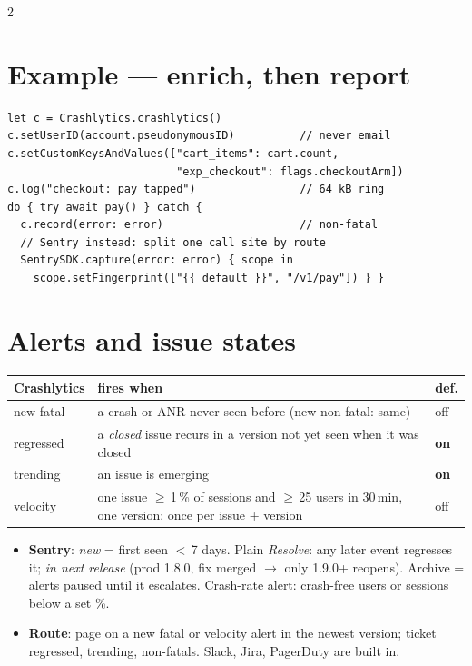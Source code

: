 \documentclass[8pt]{extarticle}
\begin{document}
\begin{multicols}{2}
\section{Example — enrich, then report}
\begin{lstlisting}[language=SwiftSheet]
let c = Crashlytics.crashlytics()
c.setUserID(account.pseudonymousID)          // never email
c.setCustomKeysAndValues(["cart_items": cart.count,
                          "exp_checkout": flags.checkoutArm])
c.log("checkout: pay tapped")                // 64 kB ring
do { try await pay() } catch {
  c.record(error: error)                     // non-fatal
  // Sentry instead: split one call site by route
  SentrySDK.capture(error: error) { scope in
    scope.setFingerprint(["{{ default }}", "/v1/pay"]) } }
\end{lstlisting}

\columnbreak

\section{Alerts and issue states}
{\footnotesize\setlength{\tabcolsep}{3pt}
\begin{tabular}{@{}>{\raggedright\arraybackslash}p{16mm}>{\raggedright\arraybackslash}p{51mm}>{\raggedright\arraybackslash}p{7mm}@{}}
\toprule
\textbf{Crashlytics} & \textbf{fires when} & \textbf{def.}\\ \midrule
new fatal & a crash or ANR never seen before (new non-fatal: same) & off\\
regressed & a \emph{closed} issue recurs in a version not yet seen when it was closed & \textbf{on}\\
trending & an issue is emerging & \textbf{on}\\
velocity & one issue $\ge$\,1\,\% of sessions and $\ge$\,25 users in 30\,min, one version; once per issue + version & off\\
\bottomrule
\end{tabular}}
\begin{itemize}
  \item \textbf{Sentry}: \emph{new} = first seen $<$\,7 days. Plain \emph{Resolve}: any later
        event regresses it; \emph{in next release} (prod 1.8.0, fix merged $\to$ only 1.9.0+
        reopens). Archive = alerts paused until it escalates. Crash-rate alert: crash-free
        users or sessions below a set \%.
  \item \textbf{Route}: page on a new fatal or velocity alert in the newest version; ticket
        regressed, trending, non-fatals. Slack, Jira, PagerDuty are built in.
\end{itemize}


\end{multicols}
\end{document}
